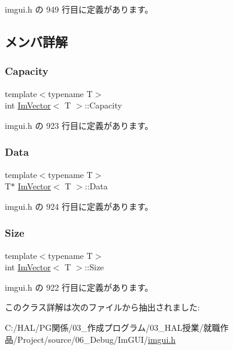  imgui.\+h の 949 行目に定義があります。



\subsection{メンバ詳解}
\mbox{\label{class_im_vector_abd24482b4d30d22e37582e521e5bfb33}} 
\subsubsection{\texorpdfstring{Capacity}{Capacity}}
{\footnotesize\ttfamily template$<$typename T$>$ \\
int \mbox{\hyperlink{class_im_vector}{Im\+Vector}}$<$ T $>$\+::Capacity}



 imgui.\+h の 923 行目に定義があります。

\mbox{\label{class_im_vector_ac0e46e8b30cb079d93c8f0aad7d7cbd0}} 
\subsubsection{\texorpdfstring{Data}{Data}}
{\footnotesize\ttfamily template$<$typename T$>$ \\
T$\ast$ \mbox{\hyperlink{class_im_vector}{Im\+Vector}}$<$ T $>$\+::Data}



 imgui.\+h の 924 行目に定義があります。

\mbox{\label{class_im_vector_abbfd157947f66280d27b21d70a16df8d}} 
\subsubsection{\texorpdfstring{Size}{Size}}
{\footnotesize\ttfamily template$<$typename T$>$ \\
int \mbox{\hyperlink{class_im_vector}{Im\+Vector}}$<$ T $>$\+::Size}



 imgui.\+h の 922 行目に定義があります。



このクラス詳解は次のファイルから抽出されました\+:\begin{DoxyCompactItemize}
\item 
C\+:/\+H\+A\+L/\+P\+G関係/03\+\_\+作成プログラム/03\+\_\+\+H\+A\+L授業/就職作品/\+Project/source/06\+\_\+\+Debug/\+Im\+G\+U\+I/\mbox{\hyperlink{imgui_8h}{imgui.\+h}}\end{DoxyCompactItemize}

